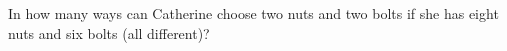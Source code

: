 In how many ways can Catherine choose two nuts and two bolts if she has eight nuts and six bolts (all different)?
